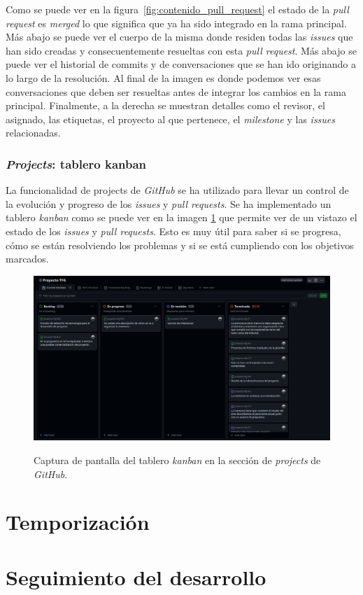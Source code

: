 Como se puede ver en la figura~\ref{fig:contenido_pull_request} el estado de la \textit{pull request} es \textit{merged} lo que significa que ya ha sido integrado en la rama principal. Más abajo se puede ver el cuerpo de la misma donde residen todas las \textit{issues} que han sido creadas y consecuentemente resueltas con esta \textit{pull request}. Más abajo se puede ver el historial de commits y de conversaciones que se han ido originando a lo largo de la resolución. Al final de la imagen es donde podemos ver esas conversaciones que deben ser resueltas antes de integrar los cambios en la rama principal. Finalmente, a la derecha se muestran detalles como el revisor, el asignado, las etiquetas, el proyecto al que pertenece, el \textit{milestone} y las \textit{issues} relacionadas.

\subsubsection{\textit{Projects}: tablero kanban}

La funcionalidad de projects de \textit{GitHub} se ha utilizado para llevar un control de la evolución y progreso de los \textit{issues} y \textit{pull requests}. Se ha implementado un tablero \textit{kanban} como se puede ver en la imagen \ref{fig:tablero_kanban} que permite ver de un vistazo el estado de los \textit{issues} y \textit{pull requests}. Esto es muy útil para saber si se progresa, cómo se están resolviendo los problemas y si se está cumpliendo con los objetivos marcados.

\begin{figure}[H]
    \caption{Captura de pantalla del tablero \textit{kanban} en la sección de \textit{projects} de \textit{GitHub}.}
    \centering
    \vspace*{0.5cm}
    \includegraphics[scale=0.2]{figuras/projects_github.png}\label{fig:tablero_kanban}
\end{figure}

\section{Temporización}

\section{Seguimiento del desarrollo}